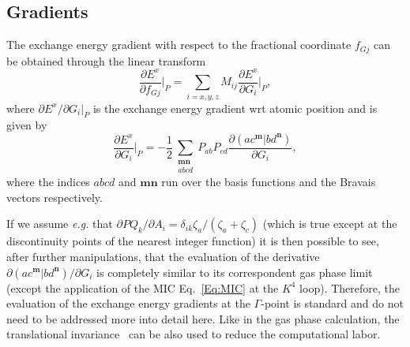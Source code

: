 \documentclass[prl,twocolumn,showpacs,twocolumngrid,superbib]{revtex4}
\begin{document}
\subsection{Gradients}
The exchange energy gradient with respect to the fractional coordinate 
$f_{Gj}$ can be obtained through the linear transform 
\begin{equation*}
 \frac{\partial E^x}{\partial f_{Gj}}\bigg|_P=\sum_{i=x,y,z}M_{ij}\frac{\partial E^x}{\partial G_i}\bigg|_P,
\end{equation*}
where $\partial E^x/\partial G_i|_P$ is the exchange energy gradient wrt atomic position and
is given by
\begin{equation}\label{Eq:Grad}
  \frac{\partial E^x}{\partial G_i}\bigg|_P =
  -\frac{1}{2}\sum_{\substack{\mathbf{m}\mathbf{n}\\a b c d}}P_{ab}P_{cd}
  \frac{\partial(ac^\mathbf{m}|bd^\mathbf{n})}{\partial G_i},
\end{equation}
where the indices $abcd$ and $\mathbf{mn}$ run over the basis functions and the
Bravais vectors respectively.

If we assume {\it e.g.} that $\partial PQ_k/\partial A_i=\delta_{ik}\zeta_a/(\zeta_a+\zeta_c)$
(which is true except at the discontinuity points of the nearest integer function) 
it is then possible to see, after further manipulations, 
that the evaluation of the derivative $\partial(ac^\mathbf{m}|bd^\mathbf{n})/\partial G_i$
is completely similar to its correspondent gas phase
limit (except the application of the MIC Eq.~\ref{Eq:MIC} at the $K^4$ loop). 
Therefore, the evaluation of the exchange energy gradients at the $\Gamma$-point
is standard and do not need to be addressed more 
into detail here. Like in the gas phase calculation, the translational 
invariance~\cite{AKorminicki77} can be also used to reduce the computational labor.
\end{document}
